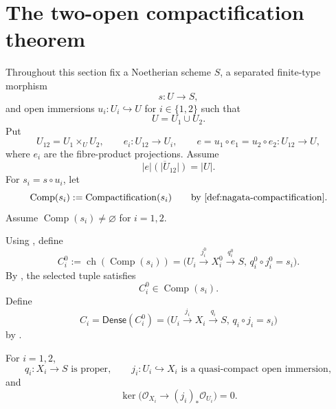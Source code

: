 \section{The two-open compactification theorem}

Throughout this section fix a Noetherian scheme $S$, a separated finite-type
morphism
\[
  s\colon U\longrightarrow S,
\]
and open immersions $u_i\colon U_i\hookrightarrow U$ for $i\in\{1,2\}$ such
that
\[
  U=U_1\cup U_2.
\]
Put
\[
  U_{12}=U_1\times_UU_2,\qquad
  e_i\colon U_{12}\to U_i,\qquad
  e=u_1\circ e_1=u_2\circ e_2\colon U_{12}\to U,
\]
where $e_i$ are the fibre-product projections.  Assume
\[
  \overline{|e|(|U_{12}|)}=|U|.
\]
For $s_i=s\circ u_i$, let
\[
  \operatorname{Comp}(s_i)
    :=\operatorname{Compactification}(s_i)
    \qquad\text{by \Cref{def:nagata-compactification}}.
\]
Assume $\operatorname{Comp}(s_i)\neq\varnothing$ for $i=1,2$.

\begin{definition}
  \label{def:nagata-two-open-dense-compactifications}

  Using , define
  \[
    C_i^0
      :=\operatorname{ch}(\operatorname{Comp}(s_i))
      =\bigl(
          U_i\xrightarrow{j_i^0}X_i^0\xrightarrow{q_i^0}S,\,
          q_i^0\circ j_i^0=s_i
        \bigr).
  \]
  By , the selected tuple satisfies
  \[
    C_i^0\in\operatorname{Comp}(s_i).                            \tag{TODC0}
  \]
  Define
  \[
    C_i=\mathsf{Dense}(C_i^0)
      =\bigl(
          U_i\xrightarrow{j_i}X_i\xrightarrow{q_i}S,\,
          q_i\circ j_i=s_i
        \bigr)
  \]
  by .
\end{definition}

\begin{lemma}
  \label{lemma:nagata-two-open-dense-compactifications}

  For $i=1,2$,
  \[
    q_i\colon X_i\to S\text{ is proper},\qquad
    j_i\colon U_i\hookrightarrow X_i\text{ is a quasi-compact open immersion},
  \]
  and
  \[
    \ker\bigl(\mathcal O_{X_i}\to(j_i)_*\mathcal O_{U_i}\bigr)=0.
  \]
\end{lemma}

